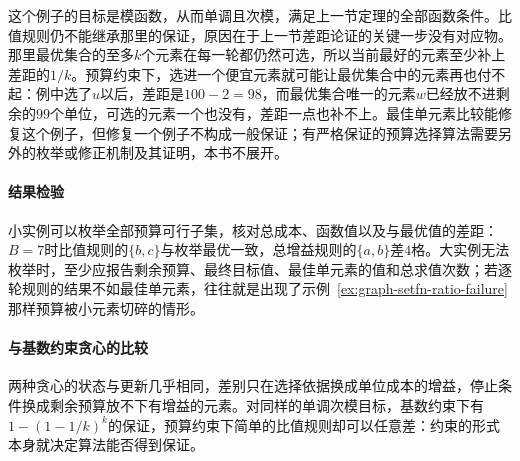 这个例子的目标是模函数，从而单调且次模，满足上一节定理的全部函数条件。比值规则仍不能继承那里的保证，原因在于上一节差距论证的关键一步没有对应物。那里最优集合的至多$k$个元素在每一轮都仍然可选，所以当前最好的元素至少补上差距的$1/k$。预算约束下，选进一个便宜元素就可能让最优集合中的元素再也付不起：例中选了$u$以后，差距是$100-2=98$，而最优集合唯一的元素$w$已经放不进剩余的$99$个单位，可选的元素一个也没有，差距一点也补不上。最佳单元素比较能修复这个例子，但修复一个例子不构成一般保证；有严格保证的预算选择算法需要另外的枚举或修正机制及其证明，本书不展开。

\paragraph{结果检验}
小实例可以枚举全部预算可行子集，核对总成本、函数值以及与最优值的差距：$B=7$时比值规则的$\{b,c\}$与枚举最优一致，总增益规则的$\{a,b\}$差$4$格。大实例无法枚举时，至少应报告剩余预算、最终目标值、最佳单元素的值和总求值次数；若逐轮规则的结果不如最佳单元素，往往就是出现了示例~\ref{ex:graph-setfn-ratio-failure}那样预算被小元素切碎的情形。

\paragraph{与基数约束贪心的比较}
两种贪心的状态与更新几乎相同，差别只在选择依据换成单位成本的增益，停止条件换成剩余预算放不下有增益的元素。对同样的单调次模目标，基数约束下有$1-(1-1/k)^k$的保证，预算约束下简单的比值规则却可以任意差：约束的形式本身就决定算法能否得到保证。
